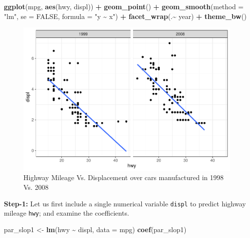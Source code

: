 \documentclass[
]{book}
\newenvironment{Shaded}{\begin{snugshade}}{\end{snugshade}}
\newcommand{\AttributeTok}[1]{\textcolor[rgb]{0.13,0.29,0.53}{#1}}
\newcommand{\ConstantTok}[1]{\textcolor[rgb]{0.56,0.35,0.01}{#1}}
\newcommand{\FunctionTok}[1]{\textcolor[rgb]{0.13,0.29,0.53}{\textbf{#1}}}
\newcommand{\NormalTok}[1]{#1}
\newcommand{\OtherTok}[1]{\textcolor[rgb]{0.56,0.35,0.01}{#1}}
\newcommand{\SpecialCharTok}[1]{\textcolor[rgb]{0.81,0.36,0.00}{\textbf{#1}}}
\newcommand{\StringTok}[1]{\textcolor[rgb]{0.31,0.60,0.02}{#1}}
\begin{document}
\begin{Shaded}
\begin{Highlighting}[]
\FunctionTok{ggplot}\NormalTok{(mpg, }\FunctionTok{aes}\NormalTok{(hwy, displ)) }\SpecialCharTok{+}
  \FunctionTok{geom\_point}\NormalTok{() }\SpecialCharTok{+}
  \FunctionTok{geom\_smooth}\NormalTok{(}\AttributeTok{method =} \StringTok{"lm"}\NormalTok{, }\AttributeTok{se =} \ConstantTok{FALSE}\NormalTok{, }\AttributeTok{formula =} \StringTok{"y \textasciitilde{} x"}\NormalTok{) }\SpecialCharTok{+}
  \FunctionTok{facet\_wrap}\NormalTok{(.}\SpecialCharTok{\textasciitilde{}}\NormalTok{ year) }\SpecialCharTok{+}
  \FunctionTok{theme\_bw}\NormalTok{()}
\end{Highlighting}
\end{Shaded}

\begin{figure}

{\centering \includegraphics[height=0.35\textheight]{DauR_files/figure-latex/ex4vis-1} 

}

\caption{Highway Mileage Vs. Displacement over cars manufactured in 1998 Vs. 2008}\label{fig:ex4vis}
\end{figure}

\textbf{Step-1:} Let us first include a single numerical variable \texttt{displ} to predict highway mileage \texttt{hwy}; and examine the coefficients.

\begin{Shaded}
\begin{Highlighting}[]
\NormalTok{par\_slop1 }\OtherTok{\textless{}{-}} \FunctionTok{lm}\NormalTok{(hwy }\SpecialCharTok{\textasciitilde{}}\NormalTok{ displ, }\AttributeTok{data =}\NormalTok{ mpg)}
\FunctionTok{coef}\NormalTok{(par\_slop1)}
\end{Highlighting}
\end{Shaded}
\end{document}
